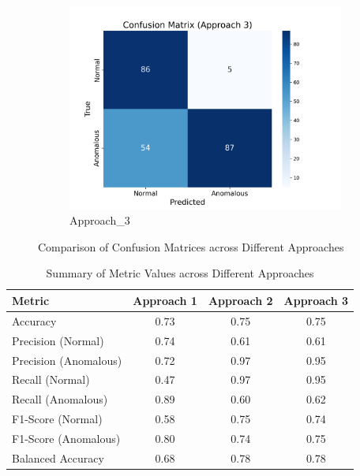 \documentclass[12pt,DIV14,BCOR12mm,a4paper,footinclude=false,headinclude,parskip=half-,twoside,openright,cleardoublepage=empty,toc=index,bibliography=totoc,listof=totoc]{scrreprt}
\numberwithin{equation}{chapter}
\begin{document}
\begin{figure}
\begin{subfigure}[b]{0.55\textwidth}
    \end{subfigure}
    \\ %
    \begin{subfigure}[b]{0.55\textwidth} %
        \centering
        \includegraphics[width=\textwidth]{../media/confusion_matrix_approach_3.png}
        \caption{Approach\_3}
        \label{fig:confusion3}
    \end{subfigure}
    
    \caption{Comparison of Confusion Matrices across Different Approaches}
    \label{fig:confusion_matrices}
\end{figure}

\begin{table}
    \centering
    \caption{Summary of Metric Values across Different Approaches}
    \label{tab:metrics_summary}
    \begin{tabular}{lccc} %
        \toprule
        \textbf{Metric} & \textbf{Approach 1} & \textbf{Approach 2} & \textbf{Approach 3} \\ 
        \midrule
        Accuracy & 0.73 & 0.75 & 0.75 \\ 
        Precision (Normal) & 0.74 & 0.61 & 0.61 \\ 
        Precision (Anomalous) & 0.72 & 0.97 & 0.95 \\ 
        Recall (Normal) & 0.47 & 0.97 & 0.95 \\ 
        Recall (Anomalous) & 0.89 & 0.60 & 0.62 \\ 
        F1-Score (Normal) & 0.58 & 0.75 & 0.74 \\ 
        F1-Score (Anomalous) & 0.80 & 0.74 & 0.75 \\ 
        Balanced Accuracy & 0.68 & 0.78 & 0.78 \\ 
        \bottomrule
    \end{tabular}
\end{table}
\end{document}
